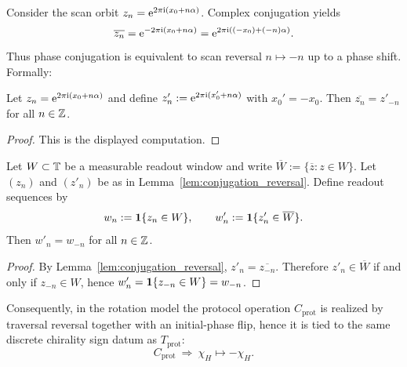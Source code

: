 Consider the scan orbit $z_n=\mathrm{e}^{2\pi\mathrm{i}(x_0+n\alpha)}$.
Complex conjugation yields
\[
\overline{z_n}=\mathrm{e}^{-2\pi\mathrm{i}(x_0+n\alpha)}=\mathrm{e}^{2\pi\mathrm{i}((-x_0)+(-n)\alpha)}.
\]
Thus phase conjugation is equivalent to scan reversal $n\mapsto -n$ up to a phase shift.
Formally:
\begin{lemma}\label{lem:conjugation_reversal}
Let $z_n=\mathrm{e}^{2\pi\mathrm{i}(x_0+n\alpha)}$ and define $z'_n:=\mathrm{e}^{2\pi\mathrm{i}(x_0'+n\alpha)}$ with $x_0'=-x_0$.
Then $\overline{z_n}=z'_{-n}$ for all $n\in\mathbb{Z}$.
\end{lemma}
\begin{proof}
This is the displayed computation.
\end{proof}
\begin{lemma}\label{lem:conjugation_readout_reversal}
Let $W\subset\mathbb{T}$ be a measurable readout window and write $\overline{W}:=\{\overline{z}:z\in W\}$.
Let $(z_n)$ and $(z'_n)$ be as in Lemma~\ref{lem:conjugation_reversal}.
Define readout sequences by
\[
w_n:=\mathbf{1}\{z_n\in W\},\qquad
w'_n:=\mathbf{1}\{z'_n\in \overline{W}\}.
\]
Then $w'_n=w_{-n}$ for all $n\in\mathbb{Z}$.
\end{lemma}
\begin{proof}
By Lemma~\ref{lem:conjugation_reversal}, $z'_n=\overline{z_{-n}}$.
Therefore $z'_n\in\overline{W}$ if and only if $z_{-n}\in W$, hence $w'_n=\mathbf{1}\{z_{-n}\in W\}=w_{-n}$.
\end{proof}
Consequently, in the rotation model the protocol operation $C_{\mathrm{prot}}$ is realized by traversal reversal together with an initial-phase flip, hence it is tied to the same discrete chirality sign datum as $T_{\mathrm{prot}}$:
\[
C_{\mathrm{prot}}\ \Longrightarrow\ \chi_H\mapsto -\chi_H.
\]
